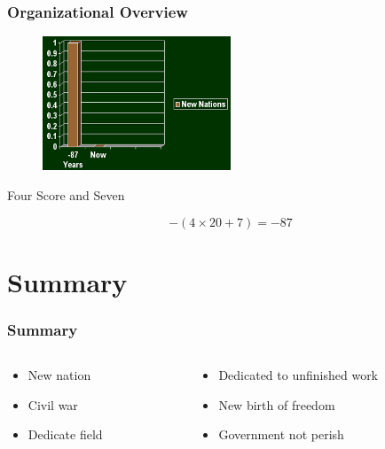 \documentclass{beamer}
\begin{document}
\begin{frame}

\frametitle{Organizational Overview}

\begin{figure}
\includegraphics[width=0.5\textwidth]{gettysburg_graph.png}
\end{figure}

\begin{block}{Four Score and Seven}

\begin{equation}
-(4 \times 20 + 7) = -87
\end{equation}

\end{block}

\end{frame}

\section{Summary}

\begin{frame}

\frametitle{Summary}

\begin{columns}

\begin{column}{0.4\textwidth}

\begin{itemize}
\item New nation
\item Civil war
\item Dedicate field
\end{itemize}

\end{column}

\begin{column}{0.6\textwidth}

\begin{itemize}
\item Dedicated to unfinished work
\item New birth of freedom
\item Government not perish
\end{itemize}

\end{column}

\end{columns}

\end{frame}
\end{document}
